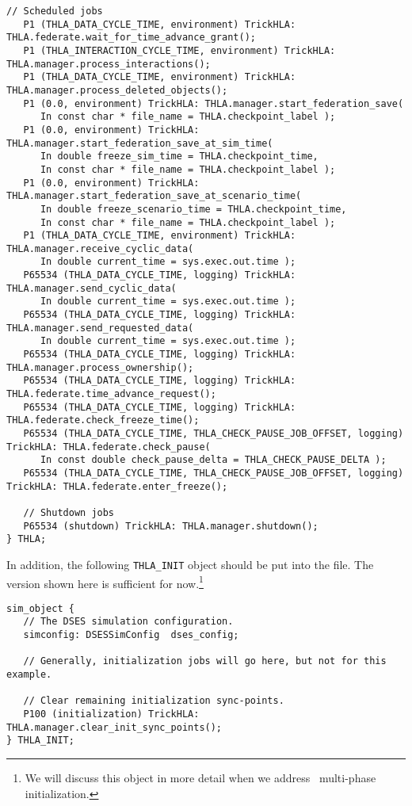 \begin{lstlisting}[caption={The {\tt THLA sim\_object}},label={list:THLA-sim-object}]
   // Scheduled jobs
   P1 (THLA_DATA_CYCLE_TIME, environment) TrickHLA: THLA.federate.wait_for_time_advance_grant();
   P1 (THLA_INTERACTION_CYCLE_TIME, environment) TrickHLA: THLA.manager.process_interactions();
   P1 (THLA_DATA_CYCLE_TIME, environment) TrickHLA: THLA.manager.process_deleted_objects();
   P1 (0.0, environment) TrickHLA: THLA.manager.start_federation_save(
      In const char * file_name = THLA.checkpoint_label );
   P1 (0.0, environment) TrickHLA: THLA.manager.start_federation_save_at_sim_time(
      In double freeze_sim_time = THLA.checkpoint_time,
      In const char * file_name = THLA.checkpoint_label );
   P1 (0.0, environment) TrickHLA: THLA.manager.start_federation_save_at_scenario_time(
      In double freeze_scenario_time = THLA.checkpoint_time,
      In const char * file_name = THLA.checkpoint_label );
   P1 (THLA_DATA_CYCLE_TIME, environment) TrickHLA: THLA.manager.receive_cyclic_data(
      In double current_time = sys.exec.out.time );
   P65534 (THLA_DATA_CYCLE_TIME, logging) TrickHLA: THLA.manager.send_cyclic_data(
      In double current_time = sys.exec.out.time );
   P65534 (THLA_DATA_CYCLE_TIME, logging) TrickHLA: THLA.manager.send_requested_data(
      In double current_time = sys.exec.out.time );
   P65534 (THLA_DATA_CYCLE_TIME, logging) TrickHLA: THLA.manager.process_ownership();
   P65534 (THLA_DATA_CYCLE_TIME, logging) TrickHLA: THLA.federate.time_advance_request();
   P65534 (THLA_DATA_CYCLE_TIME, logging) TrickHLA: THLA.federate.check_freeze_time();
   P65534 (THLA_DATA_CYCLE_TIME, THLA_CHECK_PAUSE_JOB_OFFSET, logging) TrickHLA: THLA.federate.check_pause( 
      In const double check_pause_delta = THLA_CHECK_PAUSE_DELTA );
   P65534 (THLA_DATA_CYCLE_TIME, THLA_CHECK_PAUSE_JOB_OFFSET, logging) TrickHLA: THLA.federate.enter_freeze();

   // Shutdown jobs
   P65534 (shutdown) TrickHLA: THLA.manager.shutdown();
} THLA;
\end{lstlisting}

In addition, the following {\tt THLA\_INIT} object should be put
into the \sdefine file.
The version shown here is sufficient for now.\footnote{
  We will discuss this object in more detail when we address
  \TrickHLA\ multi-phase initialization.
}

\begin{lstlisting}[caption={The {\tt THLA\_INIT sim\_object}},label={list:THLA-INIT-sim-object}]
sim_object {
   // The DSES simulation configuration.
   simconfig: DSESSimConfig  dses_config;

   // Generally, initialization jobs will go here, but not for this example.
   
   // Clear remaining initialization sync-points.
   P100 (initialization) TrickHLA: THLA.manager.clear_init_sync_points();
} THLA_INIT;
\end{lstlisting}

